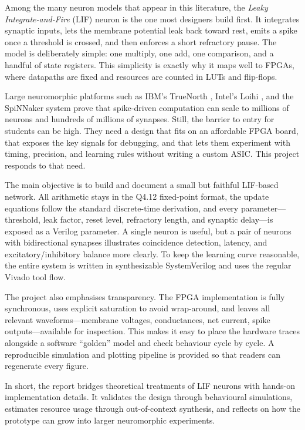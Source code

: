 \documentclass[10pt,onecolumn]{IEEEtran}
\begin{document}
Among the many neuron models that appear in this literature, the \emph{Leaky Integrate-and-Fire} (LIF) neuron is the one most designers build first. It integrates synaptic inputs, lets the membrane potential leak back toward rest, emits a spike once a threshold is crossed, and then enforces a short refractory pause. The model is deliberately simple: one multiply, one add, one comparison, and a handful of state registers. This simplicity is exactly why it maps well to FPGAs, where datapaths are fixed and resources are counted in LUTs and flip-flops.

Large neuromorphic platforms such as IBM’s TrueNorth \cite{Merolla2014}, Intel’s Loihi \cite{Davies2018}, and the SpiNNaker system \cite{Furber2014} prove that spike-driven computation can scale to millions of neurons and hundreds of millions of synapses. Still, the barrier to entry for students can be high. They need a design that fits on an affordable FPGA board, that exposes the key signals for debugging, and that lets them experiment with timing, precision, and learning rules without writing a custom ASIC. This project responds to that need.

The main objective is to build and document a small but faithful LIF-based network. All arithmetic stays in the Q4.12 fixed-point format, the update equations follow the standard discrete-time derivation, and every parameter—threshold, leak factor, reset level, refractory length, and synaptic delay—is exposed as a Verilog parameter. A single neuron is useful, but a pair of neurons with bidirectional synapses illustrates coincidence detection, latency, and excitatory/inhibitory balance more clearly. To keep the learning curve reasonable, the entire system is written in synthesizable SystemVerilog and uses the regular Vivado tool flow.

The project also emphasises transparency. The FPGA implementation is fully synchronous, uses explicit saturation to avoid wrap-around, and leaves all relevant waveforms—membrane voltages, conductances, net current, spike outputs—available for inspection. This makes it easy to place the hardware traces alongside a software “golden” model and check behaviour cycle by cycle. A reproducible simulation and plotting pipeline is provided so that readers can regenerate every figure.

In short, the report bridges theoretical treatments of LIF neurons with hands-on implementation details. It validates the design through behavioural simulations, estimates resource usage through out-of-context synthesis, and reflects on how the prototype can grow into larger neuromorphic experiments.
\end{document}
